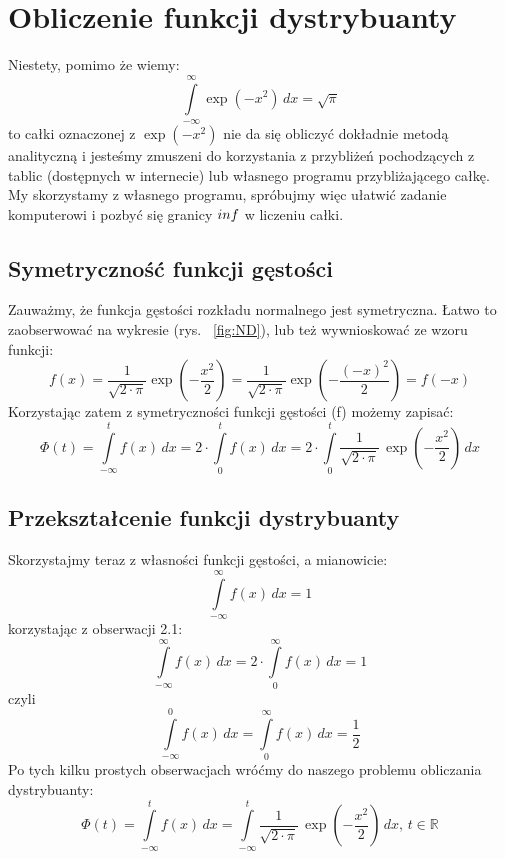 \documentclass[a4paper]{article}
\begin{document}
\section{Obliczenie funkcji dystrybuanty}
Niestety, pomimo że wiemy:
$$\int\limits_{-\infty}^{\infty} \exp(-x^2)\,dx = \sqrt{\pi}$$ to całki oznaczonej z $\exp(-x^2) $ nie da się obliczyć dokładnie metodą analityczną i jesteśmy zmuszeni do korzystania z przybliżeń pochodzących z tablic (dostępnych w internecie) lub własnego programu przybliżającego całkę. My skorzystamy z własnego programu, spróbujmy więc ułatwić zadanie komputerowi i pozbyć się granicy $\-inf$ w liczeniu całki.
\subsection{Symetryczność funkcji gęstości}
Zauważmy, że funkcja gęstości rozkładu normalnego jest symetryczna. Łatwo to zaobserwować na wykresie (rys. ~\ref{fig:ND}), lub też wywnioskować ze wzoru funkcji:
$$f(x) = \frac{1}{\sqrt{2\cdot\pi}}\exp\left(-\frac{x^2}{2}\right) = \frac{1}{\sqrt{2\cdot\pi}}\exp\left(-\frac{(-x)^2}{2}\right) = f(-x)$$
Korzystając zatem z symetryczności funkcji gęstości (f) możemy zapisać:
$$\Phi(t) = \int\limits_{-\infty}^t f(x)\,dx = 2 \cdot \int\limits_{0}^t f(x)\,dx = 2 \cdot \int\limits_{0}^t \frac{1}{\sqrt{2\cdot\pi}}\,\exp\left(-\frac{x^2}{2}\right)\,dx $$
\subsection{Przekształcenie funkcji dystrybuanty}
Skorzystajmy teraz z własności funkcji gęstości, a mianowicie:
$$\int\limits_{-\infty}^{\infty} f(x)\,dx = 1$$
korzystając z obserwacji 2.1:
$$\int\limits_{-\infty}^{\infty} f(x)\,dx = 2 \cdot \int\limits_{0}^{\infty} f(x)\,dx =1$$
czyli
$$\int\limits_{-\infty}^{0} f(x)\,dx = \int\limits_{0}^{\infty} f(x)\,dx = \frac{1}{2}$$
Po tych kilku prostych obserwacjach wróćmy do naszego problemu obliczania dystrybuanty:
$$\Phi(t) = \int\limits_{-\infty}^t f(x)\,dx = \int\limits_{-\infty}^t \frac{1}{\sqrt{2\cdot\pi}}\,\exp\left(-\frac{x^2}{2}\right)\,dx,\, t \in \mathbb{R}$$
\end{document}
